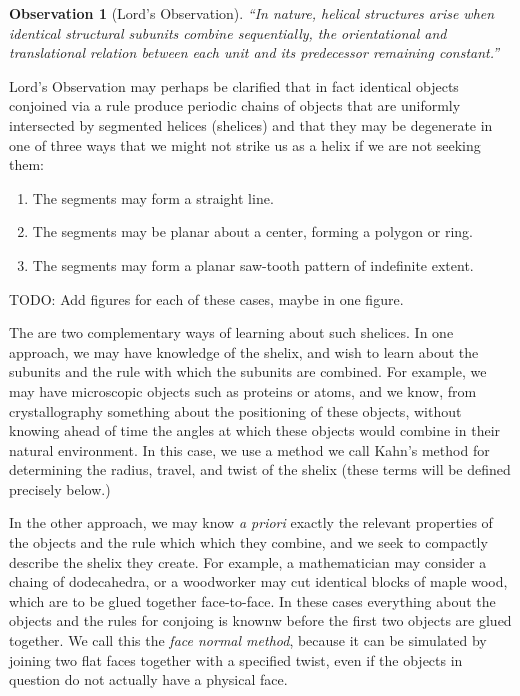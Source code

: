 \documentclass[11pt]{article}
\newtheorem{observation}{Observation}
\begin{document}
{\begin{observation}[Lord's Observation]
  “In nature, helical structures arise when identical structural subunits combine sequentially, the orientational and translational relation between each unit and its predecessor remaining constant.”\cite{lord2002helical}
\end{observation}
Lord's Observation may perhaps be clarified that in fact identical objects conjoined via a rule
produce periodic chains of objects that are uniformly intersected by segmented helices (shelices) and that they may be degenerate in one of
three ways that we might not strike us as a helix if we are not seeking them:
\begin{enumerate}
\item The segments may form a straight line.
\item The segments may be planar about a center, forming a polygon or ring.
\item The segments may form a planar saw-tooth pattern of indefinite extent.
\end{enumerate}

TODO: Add figures for each of these cases, maybe in one figure.

The are two complementary ways of learning about such shelices. In one approach, we may have knowledge of the shelix, and
wish to learn about the subunits and the rule with which the subunits are combined. For example, we may have microscopic objects such as proteins
or atoms, and we know, from crystallography something about the positioning of these objects, without
knowing ahead of time the angles at which these objects would combine in their natural environment.
In this case, we use a method we call Kahn's method\cite{kahn1989defining} for determining the radius, travel, and twist
of the shelix (these terms will be defined precisely below.)

In the other approach, we may know {\it a priori} exactly the
relevant properties of the objects and the rule which which they combine, and we seek to compactly describe the shelix they create.
For example, a mathematician may consider a chaing of dodecahedra, or a woodworker may cut identical blocks of maple wood,
which are to be glued together face-to-face. In these cases everything about the objects and the rules for conjoing
is knownw before the first two objects are glued together. We call this the {\em face normal method}, because
it can be simulated by joining two flat faces together with a specified twist, even if the objects in question
do not actually have a physical face.

}
\end{document}
